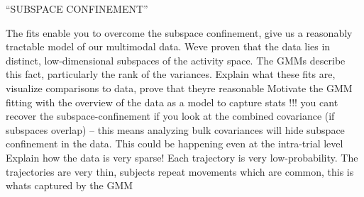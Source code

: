 \documentclass[../main.tex]{subfiles}
\begin{document}
``SUBSPACE CONFINEMENT''

The fits enable you to overcome the subspace confinement, give us a reasonably tractable model of our multimodal data. Weve proven that the data lies in distinct, low-dimensional subspaces of the activity space. The GMMs describe this fact, particularly the rank of the variances.	
Explain what these fits are, visualize comparisons to data, prove that theyre reasonable
Motivate the GMM fitting with the overview of the data as a model to capture stats
!!! you cant recover the subspace-confinement if you look at the combined covariance (if subspaces overlap) – this means analyzing bulk covariances will hide subspace confinement in the data. This could be happening even at the intra-trial level
Explain how the data is very sparse! Each trajectory is very low-probability. The trajectories are very thin, subjects repeat movements which are common, this is whats captured by the GMM
\end{document}
